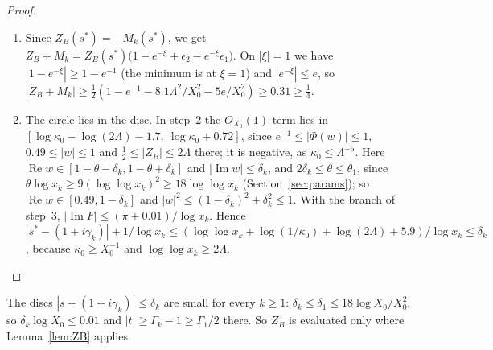 \begin{proof}
\begin{enumerate}[label=\arabic*.]
$|\epsilon_2|\le8.1\Lambda^2/\log x_k$, by step~3 and $|Z_B(s^*)|\ge\frac12$.
\item Since $Z_B(s^*)=-M_k(s^*)$, we get $Z_B+M_k=Z_B(s^*)\bigl(1-e^{-\xi}+\epsilon_2-e^{-\xi}\epsilon_1\bigr)$. On $|\xi|=1$ we have
$|1-e^{-\xi}|\ge1-e^{-1}$ (the minimum is at $\xi=1$) and $|e^{-\xi}|\le e$, so
$|Z_B+M_k|\ge\frac12(1-e^{-1}-8.1\Lambda^2/X_0^2-5e/X_0^2)\ge0.31\ge\tfrac14$.
\item The circle lies in the disc. In step~2 the $O_{X_0}(1)$ term lies in $[\log\kappa_0-\log(2\Lambda)-1.7,\ \log\kappa_0+0.72]$,
since $e^{-1}\le|\Phi(w)|\le1$, $0.49\le|w|\le1$ and $\tfrac12\le|Z_B|\le2\Lambda$ there; it is negative, as $\kappa_0\le\Lambda^{-5}$.
Here $\operatorname{Re}w\in[1-\theta-\delta_k,1-\theta+\delta_k]$ and $|\operatorname{Im}w|\le\delta_k$, and $2\delta_k\le\theta\le\theta_1$, since
$\theta\log x_k\ge9(\log\log x_k)^2\ge18\log\log x_k$ (Section~\ref{sec:params}); so $\operatorname{Re}w\in[0.49,1-\delta_k]$ and
$|w|^2\le(1-\delta_k)^2+\delta_k^2\le1$.
With the branch of step~3, $|\operatorname{Im}F|\le(\pi+0.01)/\log x_k$. Hence
$|s^*-(1+i\gamma_k)|+1/\log x_k\le(\log\log x_k+\log(1/\kappa_0)+\log(2\Lambda)+5.9)/\log x_k\le\delta_k$, because
$\kappa_0\ge X_0^{-1}$ and $\log\log x_k\ge2\Lambda$.\qedhere
\end{enumerate}
\end{proof}

The discs $|s-(1+i\gamma_k)|\le\delta_k$ are small for every $k\ge1$: $\delta_k\le\delta_1\le18\log X_0/X_0^2$, so $\delta_k\log X_0\le0.01$
and $|t|\ge\Gamma_k-1\ge\Gamma_1/2$ there. So $Z_B$ is evaluated only where Lemma~\ref{lem:ZB} applies.

